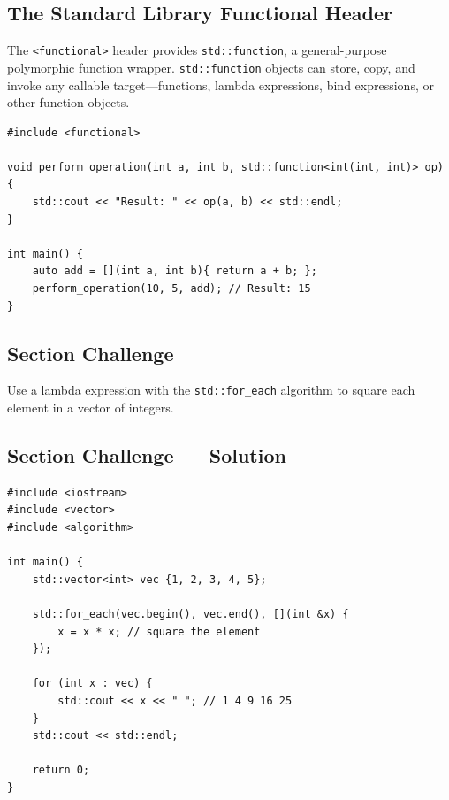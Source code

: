 \subsection{The Standard Library Functional Header}
The \texttt{<functional>} header provides \texttt{std::function}, a general-purpose polymorphic function wrapper. \texttt{std::function} objects can store, copy, and invoke any callable target---functions, lambda expressions, bind expressions, or other function objects.
\begin{lstlisting}
#include <functional>

void perform_operation(int a, int b, std::function<int(int, int)> op) {
	std::cout << "Result: " << op(a, b) << std::endl;
}

int main() {
	auto add = [](int a, int b){ return a + b; };
	perform_operation(10, 5, add); // Result: 15
}
\end{lstlisting}

\subsection{Section Challenge}
Use a lambda expression with the \texttt{std::for\_each} algorithm to square each element in a vector of integers.
\subsection{Section Challenge --- Solution}
\begin{lstlisting}
#include <iostream>
#include <vector>
#include <algorithm>

int main() {
	std::vector<int> vec {1, 2, 3, 4, 5};

	std::for_each(vec.begin(), vec.end(), [](int &x) {
		x = x * x; // square the element
	});

	for (int x : vec) {
		std::cout << x << " "; // 1 4 9 16 25
	}
	std::cout << std::endl;

	return 0;
}
\end{lstlisting}

